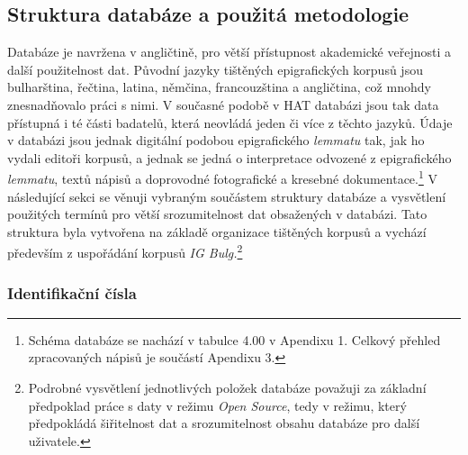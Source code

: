 
\subsection[struktura-databáze-a-použitá-metodologie]{Struktura databáze a použitá metodologie}

Databáze je navržena v angličtině, pro větší přístupnost akademické veřejnosti a další použitelnost dat. Původní jazyky tištěných epigrafických korpusů jsou bulharština, řečtina, latina, němčina, francouzština a angličtina, což mnohdy znesnadňovalo práci s nimi. V současné podobě v HAT databázi jsou tak data přístupná i té části badatelů, která neovládá jeden či více z těchto jazyků. Údaje v databázi jsou jednak digitální podobou epigrafického {\em lemmatu} tak, jak ho vydali editoři korpusů, a jednak se jedná o interpretace odvozené z epigrafického {\em lemmatu}, textů nápisů a doprovodné fotografické a kresebné dokumentace.\footnote{Schéma databáze se nachází v tabulce 4.00 v Apendixu 1. Celkový přehled zpracovaných nápisů je součástí Apendixu 3.} V následující sekci se věnuji vybraným součástem struktury databáze a vysvětlení použitých termínů pro větší srozumitelnost dat obsažených v databázi. Tato struktura byla vytvořena na základě organizace tištěných korpusů a vychází především z uspořádání korpusů {\em IG Bulg.}\footnote{Podrobné vysvětlení jednotlivých položek databáze považuji za základní předpoklad práce s daty v režimu {\em Open Source}, tedy v režimu, který předpokládá šiřitelnost dat a srozumitelnost obsahu databáze pro další uživatele.}

\subsubsection[identifikační-čísla]{Identifikační čísla}

